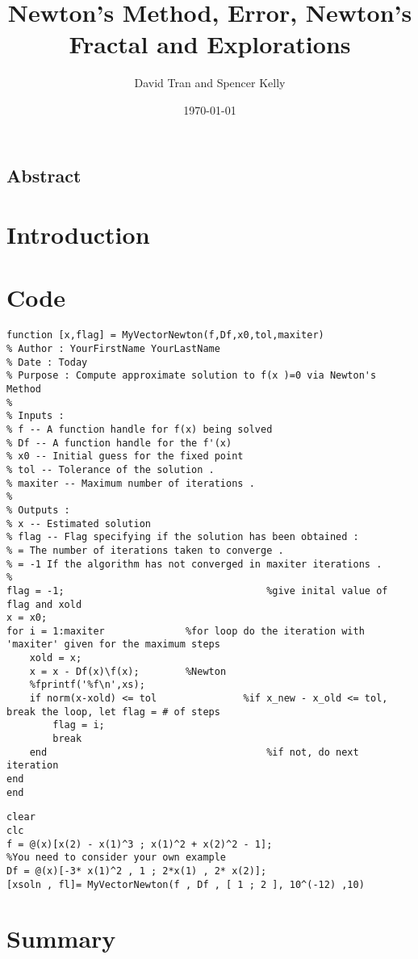 \documentclass[11pt]{article}
\title{Newton's Method, Error, Newton's Fractal and Explorations}
\author{David Tran and Spencer Kelly}
\date{\today}
\begin{document}
\maketitle

\subsection*{Abstract}


\section{Introduction}


\section{Code}

\begin{verbatim}
function [x,flag] = MyVectorNewton(f,Df,x0,tol,maxiter)
% Author : YourFirstName YourLastName
% Date : Today
% Purpose : Compute approximate solution to f(x )=0 via Newton's Method
%
% Inputs :
% f -- A function handle for f(x) being solved
% Df -- A function handle for the f'(x)
% x0 -- Initial guess for the fixed point
% tol -- Tolerance of the solution .
% maxiter -- Maximum number of iterations .
%
% Outputs :
% x -- Estimated solution
% flag -- Flag specifying if the solution has been obtained :
% = The number of iterations taken to converge .
% = -1 If the algorithm has not converged in maxiter iterations .
%
flag = -1;                                   %give inital value of flag and xold
x = x0;
for i = 1:maxiter              %for loop do the iteration with 'maxiter' given for the maximum steps
    xold = x;
    x = x - Df(x)\f(x);        %Newton
    %fprintf('%f\n',xs);
    if norm(x-xold) <= tol               %if x_new - x_old <= tol, break the loop, let flag = # of steps
        flag = i;
        break
    end                                      %if not, do next iteration
end
end
\end{verbatim}

\begin{verbatim}
clear
clc
f = @(x)[x(2) - x(1)^3 ; x(1)^2 + x(2)^2 - 1];                     %You need to consider your own example
Df = @(x)[-3* x(1)^2 , 1 ; 2*x(1) , 2* x(2)];
[xsoln , fl]= MyVectorNewton(f , Df , [ 1 ; 2 ], 10^(-12) ,10)
\end{verbatim}

\section{Summary}
\end{document}
